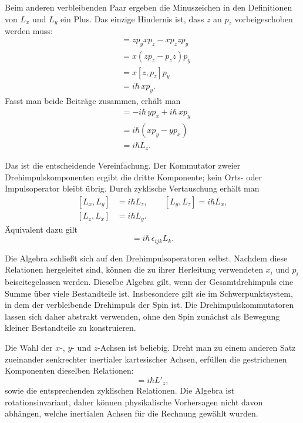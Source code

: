 Beim anderen verbleibenden Paar ergeben die Minuszeichen in den Definitionen von \(L_x\) und \(L_y\) ein Plus. Das einzige Hindernis ist, dass \(z\) an \(p_z\) vorbeigeschoben werden muss:
\begin{align}
[zp_y,xp_z]
&=zp_yxp_z-xp_zzp_y \\
&=x(zp_z-p_zz)p_y \\
&=x[z,p_z]p_y \\
&=i\hbar\,xp_y.
\end{align}
Fasst man beide Beiträge zusammen, erhält man
\begin{align}
[L_x,L_y]
&=-i\hbar\,yp_x+i\hbar\,xp_y \\
&=i\hbar(xp_y-yp_x) \\
&=i\hbar L_z.
\end{align}

Das ist die entscheidende Vereinfachung. Der Kommutator zweier Drehimpulskomponenten ergibt die dritte Komponente; kein Orts- oder Impulsoperator bleibt übrig. Durch zyklische Vertauschung erhält man
\begin{equation}
\begin{aligned}
[L_x,L_y]&=i\hbar L_z,\qquad
[L_y,L_z]=i\hbar L_x,\\
[L_z,L_x]&=i\hbar L_y.
\end{aligned}
\end{equation}
Äquivalent dazu gilt
\begin{equation}
[L_i,L_j]=i\hbar\,\epsilon_{ijk}L_k.
\end{equation}

Die Algebra schließt sich auf den Drehimpulsoperatoren selbst. Nachdem diese Relationen hergeleitet sind, können die zu ihrer Herleitung verwendeten \(x_i\) und \(p_i\) beiseitegelassen werden. Dieselbe Algebra gilt, wenn der Gesamtdrehimpuls eine Summe über viele Bestandteile ist. Insbesondere gilt sie im Schwerpunktsystem, in dem der verbleibende Drehimpuls der Spin ist. Die Drehimpulskommutatoren lassen sich daher abstrakt verwenden, ohne den Spin zunächst als Bewegung kleiner Bestandteile zu konstruieren.

Die Wahl der \(x\)-, \(y\)- und \(z\)-Achsen ist beliebig. Dreht man zu einem anderen Satz zueinander senkrechter inertialer kartesischer Achsen, erfüllen die gestrichenen Komponenten dieselben Relationen:
\begin{equation}
[L'_x,L'_y]=i\hbar L'_z,
\end{equation}
sowie die entsprechenden zyklischen Relationen. Die Algebra ist rotationsinvariant, daher können physikalische Vorhersagen nicht davon abhängen, welche inertialen Achsen für die Rechnung gewählt wurden.

